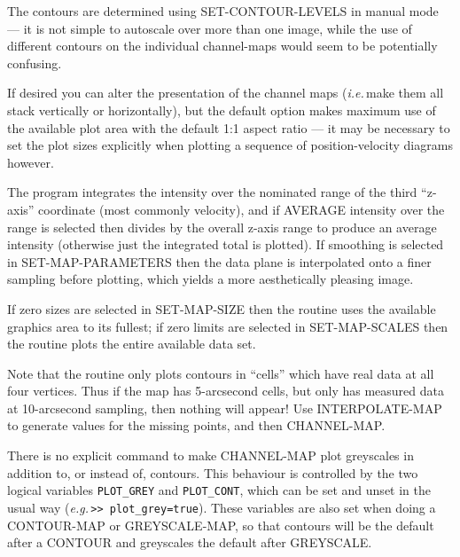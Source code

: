 \documentclass[11pt,twoside]{report}
\newcommand{\eg}{{\it e.g.\,}}
\newcommand{\ie}{{\it i.e.\,}}
\begin{document}
The contours are determined using SET-CONTOUR-LEVELS in manual mode ---
it is not simple to autoscale over more than one image, while the use
of different contours on the individual channel-maps would seem to be
potentially confusing.

If desired you can alter the presentation of the channel maps (\ie make
them all stack vertically or horizontally), but the default option makes
maximum use of the available plot area with the default 1:1 aspect ratio ---
it may be necessary to set the plot sizes explicitly when plotting a sequence
of position-velocity diagrams however.

The program integrates the intensity over the nominated range of the third
``z-axis'' coordinate (most commonly velocity), and if AVERAGE intensity
over the range is selected then divides by the overall z-axis range to 
produce an average intensity (otherwise just the integrated total is plotted).
If smoothing is selected in SET-MAP-PARAMETERS then the data plane is
interpolated onto a finer sampling before plotting, which yields a more
aesthetically pleasing image.

If zero sizes are selected in SET-MAP-SIZE then the routine uses the
available graphics area to its fullest; if zero limits are selected in
SET-MAP-SCALES then the routine plots the entire available data set.

Note that the routine only plots contours in ``cells'' which have real
data at all four vertices. Thus if the map has 5-arcsecond cells, but only
has measured data at 10-arcsecond sampling, then nothing will appear! Use
INTERPOLATE-MAP to generate values for the missing points, and then
CHANNEL-MAP.

There is no explicit command to make CHANNEL-MAP plot greyscales in addition
to, or instead of, contours. This behaviour is controlled by the two
logical variables \verb+PLOT_GREY+ and \verb+PLOT_CONT+, which can be set
and unset in the usual way (\eg \verb+>> plot_grey=true+). These variables
are also set when doing a CONTOUR-MAP or GREYSCALE-MAP, so that contours
will be the default after a CONTOUR and greyscales the default after GREYSCALE.
\end{document}
